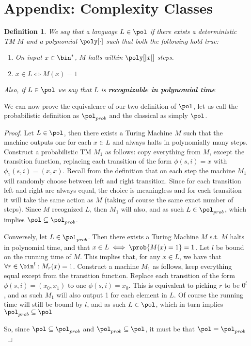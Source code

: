 \documentclass{article}
\newtheorem{definition}{Definition}
\begin{document}
\section{Appendix: Complexity Classes}
\label{complex}
\begin{definition}
    We say that a language $L \in \pol$ if there exists a deterministic TM $M$ and a polynomial $\poly[\cdot]$ such that both the following hold true:
    \begin{enumerate}
        \item On input $x \in \bin^*$, $M$ halts within $\poly[|x|]$ steps.
        \item $x \in L \iff M(x) = 1$
    \end{enumerate}
    Also, if $L \in \pol$ we say that $L$ is \textbf{recognizable in polynomial time}
\end{definition}

We can now prove the equivalence of our two definition of $\pol$, let us call the probabilistic definition as $\pol_{prob}$ and the classical as simply $\pol$.

\begin{proof}
    Let $L \in \pol$, then there exists a Turing Machine $M$ such that the machine outputs one for each $x \in L$ and always halts in polynomially many steps.
    Construct a probabilistic TM $M_1$ as follows: copy everything from $M$, except the transition function, replacing each transition of the form $\phi(s, i) = x$ with $\phi_1(s, i) = (x, x)$. Recall from the definition that on each step the machine $M_1$ will randomly choose between left and right transition. Since for each transition left and right are always equal, the choice is meaningless and for each transition it will take the same action as $M$ (taking of course the same exact number of steps). Since $M$ recognized $L$, then $M_1$ will also, and as such $L \in \pol_{prob}$, which implies $\pol \subseteq \pol_{prob}$.  \par

    Conversely, let $L \in \pol_{prob}$. Then there exists a Turing Machine $M$ s.t. $M$ halts in polynomial time, and that $ x \in L \iff \prob{M(x) = 1} = 1$. Let $l$ be bound on the running time of $M$. This implies that, for any $x \in L$, we have that $\forall r \in \bin^l : M_r(x) = 1$. Construct a machine $M_1$ as follows, keep everything equal except from the transition function. Replace each transition of the form $\phi(s, i) = (x_0, x_1)$ to one $\phi(s, i) = x_0$. This is equivalent to picking $r$ to be $0^l$, and as such $M_1$ will also output 1 for each element in $L$. Of course the running time will still be bound by $l$, and as such $L \in \pol$, which in turn implies $\pol_{prob} \subseteq \pol$  \par

    So, since $\pol \subseteq \pol_{prob}$ and $\pol_{prob} \subseteq \pol$, it must be that $\pol = \pol_{prob}$
\end{proof}
\end{document}
